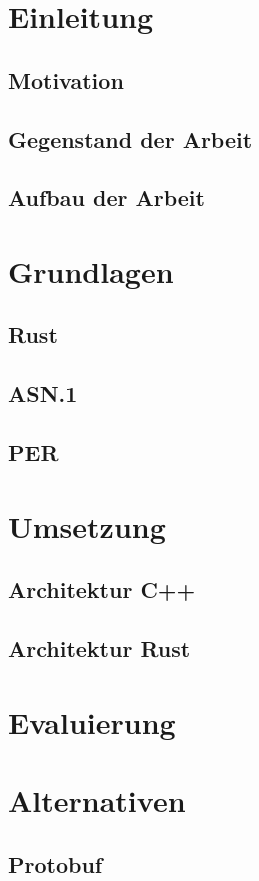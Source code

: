 \documentclass[12pt,table]{scrartcl}
\date{\gitAuthorDate}
\begin{document}
	
	
	
	
	\thispagestyle{empty}
	
	\setcounter{page}{0}
	
	\clearpage	
	\hypersetup{allcolors=black}
	\tableofcontents
	\hypersetup{allcolors=blue}
	\newpage
	
	
	\setcounter{page}{1}
	\section{Einleitung}
	\subsection{Motivation}
	\subsection{Gegenstand der Arbeit}
	\subsection{Aufbau der Arbeit}
	
	\section{Grundlagen}
	\subsection{Rust}
	\subsection{ASN.1}
	\subsection{PER}
	
	\section{Umsetzung}
	\subsection{Architektur C++}
	\subsection{Architektur Rust}
	
	\section{Evaluierung}
	
	\section{Alternativen}
	\subsection{Protobuf}
	
	
	
	
	\clearpage
	\printbibliography
	
	\clearpage
	\printglossaries

	\clearpage
	\listoffigures
	
	
\end{document}
